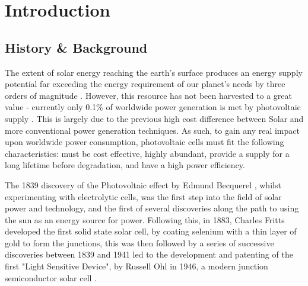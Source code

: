 
\chapter{Introduction} %

\label{Chapter1} %



\section{History \& Background}

The extent of solar energy reaching the earth's surface produces an energy supply potential far exceeding the energy requirement of our planet's needs by three orders of magnitude \citep{Morton2006}. However, this resource has not been harvested to a great value - currently only 0.1\% of worldwide power generation is met by photovoltaic supply \citep{Mitzi2011}.  This is largely due to the previous high cost difference between Solar and more conventional power generation techniques. As such, to gain any real impact upon worldwide power consumption, photovoltaic cells must fit the following characteristics: must be cost effective, highly abundant, provide a supply for a long lifetime before degradation, and have a high power efficiency.


The 1839 discovery of the Photovoltaic effect by Edmund Becquerel \citep{Nelson2003}, whilst experimenting with electrolytic cells, was the first step into the field of solar power and technology, and the first of several discoveries along the path to using the sun as an energy source for power. Following this, in 1883, Charles Fritts \citep{Fritts1883} developed the first solid state solar cell, by coating selenium with a thin layer of gold to form the junctions, this was then followed by a series of successive discoveries between 1839 and 1941 led to the development and patenting of the first "Light Sensitive Device", by Russell Ohl in 1946, a modern junction semiconductor solar cell \citep{Green2009a}. 

